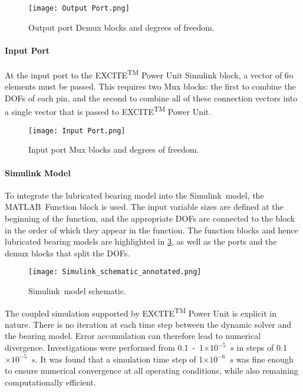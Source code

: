 \begin{figure}
	\centering  
	\texttt{[image: Output Port.png]}
	\caption{Output port Demux blocks and degrees of freedom.}
	\label{Output Port Simulink}
\end{figure} 

\paragraph{Input Port}

At the input port to the EXCITE\textsuperscript{TM} Power Unit Simulink block, a vector of 6$n$ elements must be passed. This requires two Mux blocks: the first to combine the DOFs of each pin, and the second to combine all of these connection vectors into a single vector that is passed to EXCITE\textsuperscript{TM} Power Unit.

\begin{figure}
	\centering  
	\texttt{[image: Input Port.png]}
	\caption{Input port Mux blocks and degrees of freedom.}
	\label{Input Port Simulink}
\end{figure} 

\paragraph{Simulink Model}

To integrate the lubricated bearing model into the Simulink\textregistered\ model, the MATLAB\textregistered\ Function block is used. The input variable sizes are defined at the beginning of the function, and the appropriate DOFs are connected to the block in the order of which they appear in the function. The function blocks and hence lubricated bearing models are highlighted in \ref{Simulink_model_schematic}, as well as the ports and the demux blocks that split the DOFs.

\begin{figure}
	\centering  
	\texttt{[image: Simulink\_schematic\_annotated.png]}
	\caption{Simulink\textregistered\ model schematic.}
	\label{Simulink_model_schematic}
\end{figure} 

The coupled simulation supported by EXCITE\textsuperscript{TM} Power Unit is explicit in nature. There is no iteration at each time step between the dynamic solver and the bearing model. Error accumulation can therefore lead to numerical divergence. Investigations were performed from 0.1~-~1$\times 10^{-5}$~$s$ in steps of 0.1~$\times 10^{-5}$~$s$. It was found that a simulation time step of 1$\times 10^{-6}$~$s$ was fine enough to ensure numerical convergence at all operating conditions, while also remaining computationally efficient.

